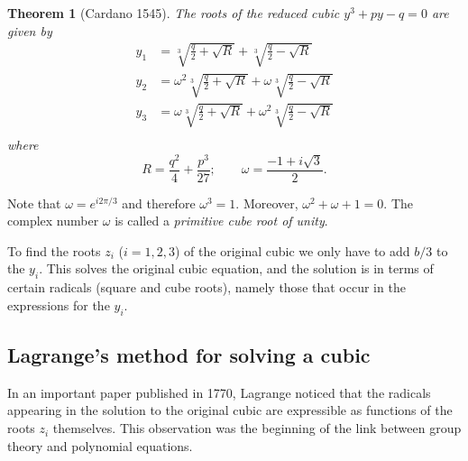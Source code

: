 \documentclass[11pt]{article}
\newtheorem*{thm*}{Theorem}
\theoremstyle{definition}
\begin{document}
\begin{thm*}[Cardano 1545]
The roots of the reduced cubic $y^3 +py - q = 0$ are given by
\begin{equation}\label{eq:Cardano}
\begin{aligned}
y_1 &= \sqrt[3]{\frac{q}{2}+\sqrt{R}} + \sqrt[3]{\frac{q}{2}-\sqrt{R}}\\
y_2 &= \omega^2 \sqrt[3]{\frac{q}{2}+\sqrt{R}} 
     + \omega \sqrt[3]{\frac{q}{2}-\sqrt{R}}\\
y_3 &= \omega \sqrt[3]{\frac{q}{2}+\sqrt{R}} 
     + \omega^2 \sqrt[3]{\frac{q}{2}-\sqrt{R}}\\
\end{aligned}
\end{equation}
where 
\[
  R = \frac{q^2}{4} + \frac{p^3}{27}; \qquad \omega = \frac{-1 + i
    \sqrt{3}}{2}.
\]
\end{thm*}

Note that $\omega = e^{i 2\pi/3}$ and therefore $\omega^3 =
1$. Moreover, $\omega^2 + \omega + 1 = 0$. The complex number $\omega$
is called a {\em primitive cube root of unity}.

To find the roots $z_i$ ($i = 1,2,3$) of the original cubic we only
have to add $b/3$ to the $y_i$.  This solves the original cubic equation,
and the solution is in terms of certain radicals (square and cube
roots), namely those that occur in the expressions for the $y_i$. 



\subsection*{Lagrange's method for solving a cubic}
%
In an important paper published in 1770, Lagrange noticed that the
radicals appearing in the solution to the
original cubic are expressible as functions of the roots $z_i$
themselves. This observation was the beginning of the link between
group theory and polynomial equations.
\end{document}

